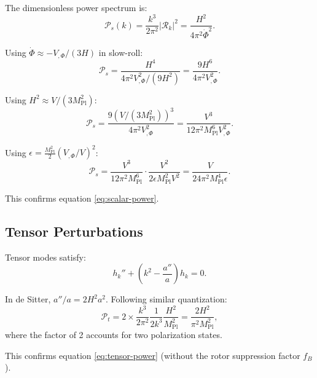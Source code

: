 \documentclass[11pt,a4paper]{article}
\numberwithin{equation}{section}
\theoremstyle{plain}
\theoremstyle{definition}
\theoremstyle{remark}
\begin{document}
The dimensionless power spectrum is:
\begin{equation}
\mathcal{P}_s(k) = \frac{k^3}{2\pi^2}|\mathcal{R}_k|^2 = \frac{H^2}{4\pi^2\dot{\Phi}^2}.
\end{equation}

Using $\dot{\Phi} \approx -V_{,\Phi}/(3H)$ in slow-roll:
\begin{equation}
\mathcal{P}_s = \frac{H^4}{4\pi^2 V_{,\Phi}^2/(9H^2)} = \frac{9H^6}{4\pi^2 V_{,\Phi}^2}.
\end{equation}

Using $H^2 \approx V/(3M_{\mathrm{Pl}}^2)$:
\begin{equation}
\mathcal{P}_s = \frac{9(V/(3M_{\mathrm{Pl}}^2))^3}{4\pi^2 V_{,\Phi}^2} = \frac{V^3}{12\pi^2 M_{\mathrm{Pl}}^6 V_{,\Phi}^2}.
\end{equation}

Using $\epsilon = \frac{M_{\mathrm{Pl}}^2}{2}(V_{,\Phi}/V)^2$:
\begin{equation}
\mathcal{P}_s = \frac{V^3}{12\pi^2 M_{\mathrm{Pl}}^6}\cdot\frac{V^2}{2\epsilon M_{\mathrm{Pl}}^2 V^2} = \frac{V}{24\pi^2 M_{\mathrm{Pl}}^4\epsilon}.
\end{equation}

This confirms equation \eqref{eq:scalar-power}.

\subsection{Tensor Perturbations}

Tensor modes satisfy:
\begin{equation}
h_k'' + \left(k^2 - \frac{a''}{a}\right)h_k = 0.
\end{equation}

In de Sitter, $a''/a = 2H^2a^2$. Following similar quantization:
\begin{equation}
\mathcal{P}_t = 2\times\frac{k^3}{2\pi^2}\frac{1}{2k^3}\frac{H^2}{M_{\mathrm{Pl}}^2} = \frac{2H^2}{\pi^2 M_{\mathrm{Pl}}^2},
\end{equation}
where the factor of 2 accounts for two polarization states.

This confirms equation \eqref{eq:tensor-power} (without the rotor suppression factor $f_B$).

\end{document}
